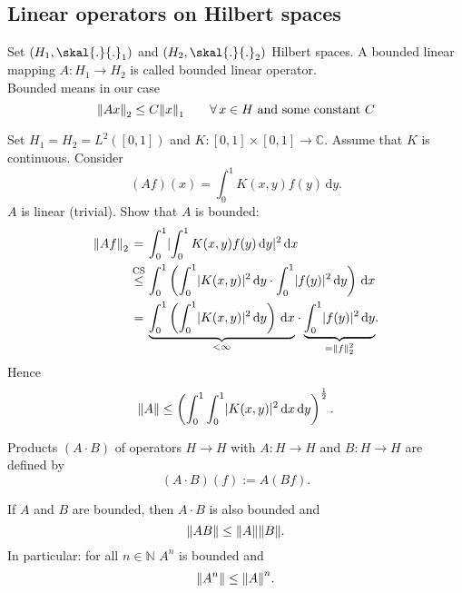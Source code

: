 \subsection{Linear operators on Hilbert spaces} 
\label{sub:linear_operators_on_hilbert_spaces}
Set $(H_1,\skal{.}{.}_1)$ and $(H_2, \skal{.}{.}_2)$ Hilbert spaces. A bounded linear mapping $A: H_1 \to H_2$ is called bounded linear operator. \\
Bounded means in our case
\[
	\norm{Ax}_2 \leq C \norm{x}_1 \qquad \forall\, x \in H \text{ and some constant }C
\] 
\begin{beispiel}
	Set $H_1 = H_2 = L^2([0,1])$ and $K: [0,1] \times [0,1] \to \mathbb{C}$. Assume that $K$ is continuous. Consider
	\[
		(Af)(x) = \int_{0}^{1}K(x,y)f(y) \,\mathrm{d}y.
	\]
	$A$ is linear (trivial). Show that $A$ is bounded:
	\begin{align*}
		\norm{Af}_2 &\stackrel{\hphantom{\text{CS}}}{=} \int_{0}^{1} \abs{\int_{0}^{1}K(x,y)f(y) \,\mathrm{d}y}^2 \,\mathrm{d}x \\
		&\stackrel{\text{CS}}{\leq} \int_{0}^{1} \left( \int_{0}^{1}\abs{K(x,y)}^2 \,\mathrm{d}y  \cdot \int_{0}^{1}\abs{f(y)}^2 \,\mathrm{d}y \right)\,\mathrm{d}x \\
		&\stackrel{\hphantom{\text{CS}}}{=} \underset{< \infty}{\underbrace{\int_{0}^{1} \left( \int_{0}^{1} \abs{K(x,y)}^2 \,\mathrm{d}y \right) \,\mathrm{d}x}}
		\cdot \underset{= \norm{f}_2^2}{\underbrace{ \int_{0}^{1}\abs{f(y)}^2 \,\mathrm{d}y}}.
	\end{align*}
	Hence
	\[
		\norm{A} \leq \left( \int_{0}^{1} \int_{0}^{1} \abs{K(x,y)}^2 \,\mathrm{d}x \,\mathrm{d}y \right)^{\frac{1}{2}}.
	\]
\end{beispiel}
	Products $(A \cdot B)$ of operators $H \to H$ with $A: H \to H$ and $B: H \to H$ are defined by
	\[
		(A \cdot B)(f) := A(Bf).
	\]
\begin{satz}
	If $A$ and $B$ are bounded, then $A \cdot B$ is also bounded and 
	\[
		\norm{AB} \leq \norm{A}\norm{B}.
	\]
	In particular: for all $n \in \mathbb{N}$ $A^n$ is bounded and 
	\[
		\norm{A^n} \leq \norm{A}^n.
	\]
\end{satz}